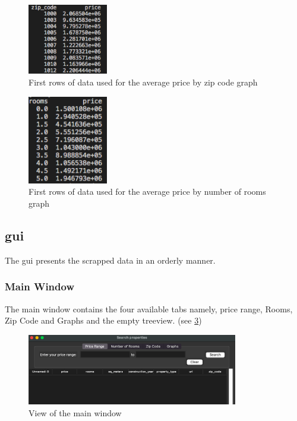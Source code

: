 \documentclass[main]{subfiles}
\begin{document}
\begin{figure}[htbp]
    \centerline{
        \includegraphics[width = 35mm]{prog_16.png}}
    \caption{First rows of data used for the average price by zip code graph}
    \label{fig:graph1}
\end{figure}

\begin{figure}[htbp]
    \centerline{
        \includegraphics[width =35mm]{prog_17.png}}
    \caption{First rows of data used for the average price by number of rooms graph}
    \label{fig:graph2}
\end{figure}



\subsection{\ac{gui}}
The \ac{gui} presents the scrapped data in an orderly manner.


\subsubsection{Main Window}
The main window contains the four available tabs namely, price range, Rooms, 
Zip Code and Graphs and the empty treeview. (see \ref{fig:Main_Window})

\begin{figure}[htbp]
    \centerline{
        \includegraphics[width = 92mm]{prog_7.png}}
    \caption{View of the main window}
    \label{fig:Main_Window}
\end{figure}
\end{document}
